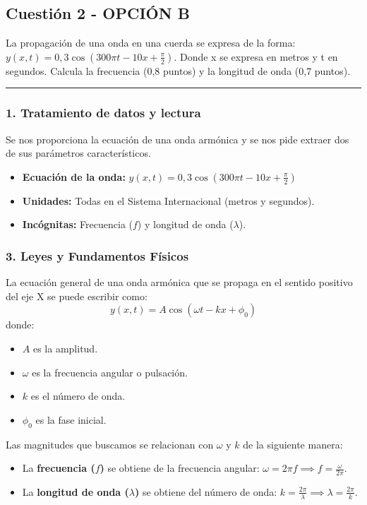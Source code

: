 \newpage

\subsection{Cuestión 2 - OPCIÓN B}
\label{subsec:2B_2009_sep_ext}

\begin{cajaenunciado}
La propagación de una onda en una cuerda se expresa de la forma: $y(x,t)=0,3\cos(300\pi t-10x+\frac{\pi}{2})$. Donde x se expresa en metros y t en segundos. Calcula la frecuencia (0,8 puntos) y la longitud de onda (0,7 puntos).
\end{cajaenunciado}
\hrule

\subsubsection*{1. Tratamiento de datos y lectura}
Se nos proporciona la ecuación de una onda armónica y se nos pide extraer dos de sus parámetros característicos.
\begin{itemize}
    \item \textbf{Ecuación de la onda:} $y(x,t)=0,3\cos(300\pi t-10x+\frac{\pi}{2})$
    \item \textbf{Unidades:} Todas en el Sistema Internacional (metros y segundos).
    \item \textbf{Incógnitas:} Frecuencia ($f$) y longitud de onda ($\lambda$).
\end{itemize}

\subsubsection*{3. Leyes y Fundamentos Físicos}
La ecuación general de una onda armónica que se propaga en el sentido positivo del eje X se puede escribir como:
$$ y(x,t) = A\cos(\omega t - kx + \phi_0) $$
donde:
\begin{itemize}
    \item $A$ es la amplitud.
    \item $\omega$ es la frecuencia angular o pulsación.
    \item $k$ es el número de onda.
    \item $\phi_0$ es la fase inicial.
\end{itemize}
Las magnitudes que buscamos se relacionan con $\omega$ y $k$ de la siguiente manera:
\begin{itemize}
    \item La \textbf{frecuencia ($f$)} se obtiene de la frecuencia angular: $\omega = 2\pi f \implies f = \frac{\omega}{2\pi}$.
    \item La \textbf{longitud de onda ($\lambda$)} se obtiene del número de onda: $k = \frac{2\pi}{\lambda} \implies \lambda = \frac{2\pi}{k}$.
\end{itemize}

